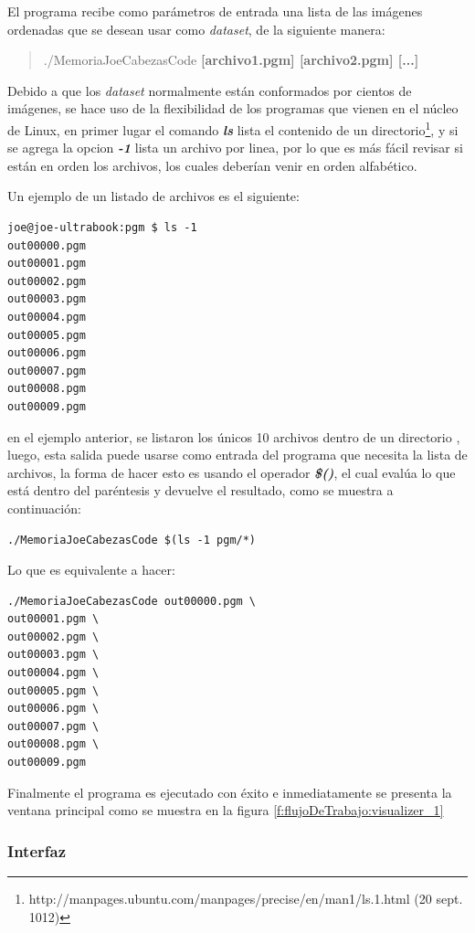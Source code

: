 El programa recibe como parámetros de entrada una lista de las imágenes ordenadas que se desean usar como \emph{dataset}, de la siguiente manera:

\begin{quote}
./MemoriaJoeCabezasCode \textbf{[archivo1.pgm] [archivo2.pgm] [...]}
\end{quote}

Debido a que los \emph{dataset} normalmente están conformados por cientos de imágenes, se hace uso de la flexibilidad de los programas que vienen en el núcleo de Linux, en primer lugar el comando \textbf{\emph{ls}} lista el contenido de un directorio\footnote{http://manpages.ubuntu.com/manpages/precise/en/man1/ls.1.html (20 sept. 1012)}, y si se agrega la opcion \textbf{\emph{-1}} lista un archivo por linea, por lo que es más fácil revisar si están en orden los archivos, los cuales deberían venir en orden alfabético.

Un ejemplo de un listado de archivos es el siguiente:

\begin{verbatim}
joe@joe-ultrabook:pgm $ ls -1
out00000.pgm
out00001.pgm
out00002.pgm
out00003.pgm
out00004.pgm
out00005.pgm
out00006.pgm
out00007.pgm
out00008.pgm
out00009.pgm
\end{verbatim}

en el ejemplo anterior, se listaron los únicos 10 archivos dentro de un directorio , luego, esta salida puede usarse como entrada del programa que necesita la lista de archivos, la forma de hacer esto es usando el operador \textbf{\emph{\$()}}, el cual evalúa lo que está dentro del paréntesis y devuelve el resultado, como se muestra a continuación:

\begin{verbatim}
./MemoriaJoeCabezasCode $(ls -1 pgm/*)
\end{verbatim}

\newpage
Lo que es equivalente a hacer:

\begin{verbatim}
./MemoriaJoeCabezasCode out00000.pgm \
out00001.pgm \
out00002.pgm \
out00003.pgm \
out00004.pgm \
out00005.pgm \
out00006.pgm \
out00007.pgm \
out00008.pgm \
out00009.pgm
\end{verbatim}

Finalmente el programa es ejecutado con éxito e inmediatamente se presenta la ventana principal como se muestra en la figura \ref{f:flujoDeTrabajo:visualizer_1}

\subsubsection{Interfaz}
\label{ch:propuesta:sec:extraccionDeLaSuperficie:subsec:interfaz}

